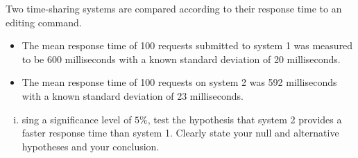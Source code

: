 \documentclass[a4paper,12pt]{article}
\begin{document}
Two time-sharing systems are compared according to their response
time to an editing command. 
\begin{itemize} 
\item The mean response time of 100 requests
submitted to system 1 was measured to be 600 milliseconds with a
known standard deviation of 20 milliseconds. \item  The mean response time
of 100 requests on system 2 was 592 milliseconds with a known
standard deviation of 23 milliseconds. \end{itemize} 
\begin{enumerate}[(i)]
\item sing a significance level of $5\%$,
test the hypothesis that system 2 provides a faster response time than
system 1.  Clearly state your null and alternative hypotheses and your
conclusion.
\end{enumerate}
\end{document}

